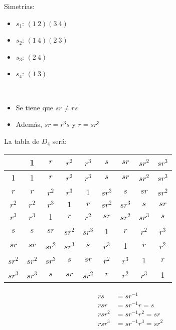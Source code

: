 Simetrías: %
\begin{itemize}
    \item $s_1$: $(1\ 2)(3\ 4)$
    \item $s_2$: $(1\ 4)(2\ 3)$
    \item $s_3$: $(2\ 4)$
    \item $s_4$: $(1\ 3)$
\end{itemize}

\begin{observacion}\
    \begin{itemize}
        \item Se tiene que $sr \neq rs$
        \item Además, $sr=r^3s$ y $r=sr^3$
    \end{itemize}
\end{observacion}

La tabla de $D_4$ será:

\begin{center} %
    \begin{tabular}{c|c|c|c|c|c|c|c|c|} %
        & 1 & $r$ & $r^2$ & $r^3$ & $s$ & $sr$ & $sr^2$ & $sr^3$\\
        \hline
        1 & 1 & $r$  & $r^2$ & $r^3$ & $s$ & $sr$ & $sr^2$ & $sr^3$\\
        \hline
        $r$ & $r$ & $r^2$ & $r^3$ & 1 & $sr^3$ & $s$ & $sr$ & $sr^2$\\
        \hline
        $r^2$ & $r^2$ & $r^3$ & $1$ & $r$ & $sr^2$ & $sr^3$ & $s$ & $sr$\\
        \hline
        $r^3$ & $r^3$ & 1 & $r$ & $r^2$ & $sr$ & $sr^2$ & $sr^3$ & $s$\\
        \hline
        $s$ & $s$ & $sr$ & $sr^2$ & $sr^3$ & 1 & $r$ & $r^2$ & $r^3$\\
        \hline
        $sr$ & $sr$ & $sr^2$ & $sr^3$ & $s$ & $r^3$ & 1 & $r$ & $r^2$\\
        \hline
        $sr^2$ & $sr^2$ & $sr^3$ & $s$ & $sr$ & $r^2$ & $r^3$ & 1 & $r$\\
        \hline
        $sr^3$ & $sr^3$ & $s$ & $sr$ & $sr^2$ & $r$ & $r^2$ & $r^3$ & 1\\
        \hline
    \end{tabular}
\end{center}

\begin{align*}
    rs &=sr^{-1}\\
    rsr &=sr^{-1}r=s \\
    rsr^2 &= sr^{-1}r^2 = sr \\
    rsr^3 &= sr^{-1}r^3= sr^2\\
\end{align*}

